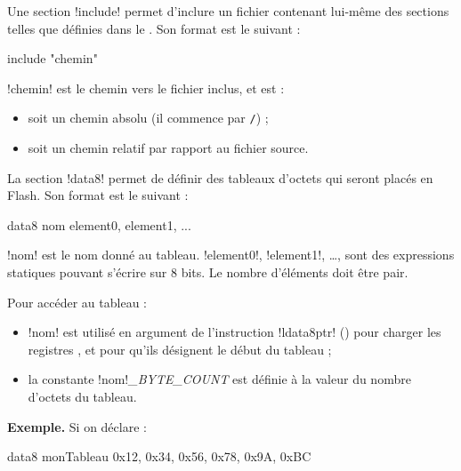 
Une section \pic!include! permet d'inclure un fichier contenant lui-même des sections telles que définies dans le .  Son format est le suivant :

\begin{piccolo}
  include "chemin"
\end{piccolo}

\pic!chemin! est le chemin vers le fichier inclus, et est :
\begin{itemize}
  \item soit un chemin absolu (il commence par \texttt{/}) ;
  \item soit un chemin relatif par rapport au fichier source.
\end{itemize}








La section \pic!data8! permet de définir des tableaux d'octets qui seront placés en Flash. Son format est le suivant :

\begin{piccolo}
  data8 nom {element0, element1, ... }
\end{piccolo}

\pic!nom! est le nom donné au tableau. \pic!element0!, \pic!element1!, …, sont des expressions statiques pouvant s'écrire sur 8 bits. Le nombre d'éléments doit être pair.

Pour accéder au tableau :
\begin{itemize}
  \item \pic!nom! est utilisé en argument de l'instruction \pic!ldata8ptr! () pour charger les registres ,  et  pour qu'ils désignent le début du tableau ;
  \item la constante \pic!nom!\emph{\small{\_BYTE\_COUNT}} est définie à la valeur du nombre d'octets du tableau.
\end{itemize}



\textbf{Exemple.} Si on déclare :
\begin{piccolo}
  data8 monTableau {0x12, 0x34, 0x56, 0x78, 0x9A, 0xBC}
\end{piccolo}

